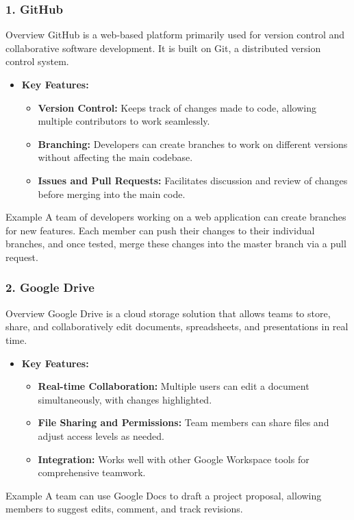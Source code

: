 \documentclass[aspectratio=169]{beamer}
\begin{document}
\begin{frame}[fragile]
    \frametitle{1. GitHub}
    \begin{block}{Overview}
        GitHub is a web-based platform primarily used for version control and collaborative software development. It is built on Git, a distributed version control system.
    \end{block}

    \begin{itemize}
        \item \textbf{Key Features:}
        \begin{itemize}
            \item \textbf{Version Control:} Keeps track of changes made to code, allowing multiple contributors to work seamlessly.
            \item \textbf{Branching:} Developers can create branches to work on different versions without affecting the main codebase.
            \item \textbf{Issues and Pull Requests:} Facilitates discussion and review of changes before merging into the main code.
        \end{itemize}
    \end{itemize}

    \begin{block}{Example}
        A team of developers working on a web application can create branches for new features. Each member can push their changes to their individual branches, and once tested, merge these changes into the master branch via a pull request.
    \end{block}
\end{frame}

\begin{frame}[fragile]
    \frametitle{2. Google Drive}
    \begin{block}{Overview}
        Google Drive is a cloud storage solution that allows teams to store, share, and collaboratively edit documents, spreadsheets, and presentations in real time.
    \end{block}
    
    \begin{itemize}
        \item \textbf{Key Features:}
        \begin{itemize}
            \item \textbf{Real-time Collaboration:} Multiple users can edit a document simultaneously, with changes highlighted.
            \item \textbf{File Sharing and Permissions:} Team members can share files and adjust access levels as needed.
            \item \textbf{Integration:} Works well with other Google Workspace tools for comprehensive teamwork.
        \end{itemize}
    \end{itemize}

    \begin{block}{Example}
        A team can use Google Docs to draft a project proposal, allowing members to suggest edits, comment, and track revisions.
    \end{block}
\end{frame}
\end{document}
